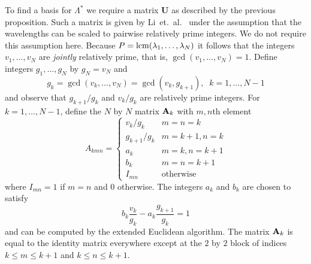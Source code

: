 \documentclass[10pt,twocolumn,twoside]{IEEEtran}
\begin{document}

To find a basis for $\Lambda^*$ we require a matrix $\mathbf{U}$ as described by the previous proposition.  Such a matrix is given by Li~et.~al.~\cite[Eq.~(76)]{Li_distance_est_wrapped_phase} under the assumption that the wavelengths can be scaled to pairwise relatively prime integers.  We do not require this assumption here.  %
Because $P = \operatorname{lcm}(\lambda_1,\dots,\lambda_N)$ it follows that the integers $v_1,\dots,v_N$ are \emph{jointly} relatively prime, that is, $\gcd(v_1,\dots,v_N) = 1$.  Define integers $g_{1},\dots,g_N$ by $g_N = v_N$ and
\[
g_k = \gcd(v_k,\dots,v_N) = \gcd(v_k,g_{k+1}), \;\; k = 1,\dots,N-1
\]
and observe that $g_{k+1}/g_k$ and $v_k/g_k$ are relatively prime integers.  For $k = 1,\dots,N-1$, define the $N$ by $N$ matrix $\mathbf{A}_k$ with $m,n$th element
\[
A_{kmn} = \begin{cases}
v_k/g_k & m=n=k \\
g_{k+1}/g_k & m=k+1, n=k \\
a_k & m=k, n=k+1 \\
b_k & m=n=k+1 \\
I_{mn} & \text{otherwise}
\end{cases}
\]
where $I_{mn} = 1$ if $m=n$ and $0$ otherwise.  The integers $a_k$ and $b_k$ are chosen to satisfy 
\begin{equation}\label{eq:akbkexteuc}
b_k \frac{v_k}{g_k} - a_k \frac{g_{k+1}}{g_k} = 1
\end{equation}
and can be computed by the extended Euclidean algorithm.  The matrix $\mathbf{A}_k$ is equal to the identity matrix everywhere except at the $2$ by $2$ block of indices $k \leq m \leq k+1$ and $k \leq n \leq k+1$.  %
\end{document}
